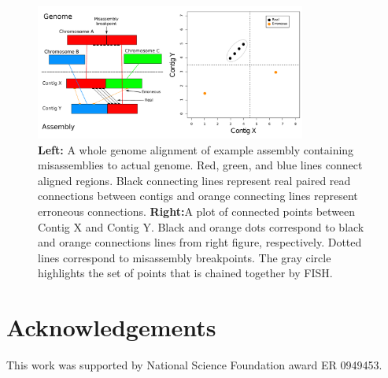 \documentclass{bioinfo}
\begin{document}
\begin{figure}[t]
\includegraphics[width=3.5in]{fish-qc.pdf}
\vspace{-1cm}
\caption{\textbf{Left:}  A whole genome alignment of example assembly containing misassemblies to actual genome. 
Red, green, and blue lines connect aligned regions. Black connecting lines represent real paired read 
connections between contigs and orange connecting lines represent erroneous connections. \textbf{Right:}A plot 
of connected points between Contig X and Contig Y. Black and orange dots correspond
to black and orange connections lines from right figure, respectively. Dotted lines correspond
to misassembly breakpoints. The gray circle highlights the set of points that is chained together
by FISH. }\label{fig:02}
\end{figure}




\section*{Acknowledgements}
This work was supported by National Science Foundation award ER 0949453.



\end{document}
